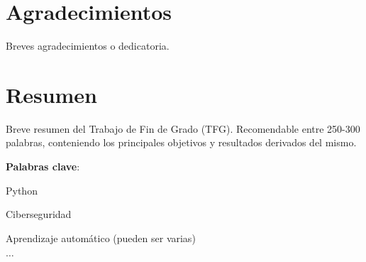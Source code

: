 \documentclass[12pt,twoside,titlepage]{report}
\newcommand\blankpage{%
    \newpage
    \null
    \thispagestyle{empty}%
    \newpage}
\begin{document}
\hypersetup{pageanchor=true}

\normalsize
\afterpage{\blankpage} %






\setlength{\parskip}{0.75em}
\renewcommand{\baselinestretch}{1.25}

\setcounter{page}{2}



\chapter*{Agradecimientos}

Breves agradecimientos o dedicatoria.

\afterpage{\blankpage}








\chapter*{Resumen}

Breve resumen del Trabajo de Fin de Grado (TFG). Recomendable entre 250-300 palabras, conteniendo los principales objetivos y resultados derivados del mismo.

\mbox{} \bigskip

\noindent \textbf{Palabras clave}:
\begin{compactitem}
	\item Python
	\item Ciberseguridad
	\item Aprendizaje automático (pueden ser varias)
	\item $\ldots$
\end{compactitem}

\afterpage{\blankpage}

\end{document}
